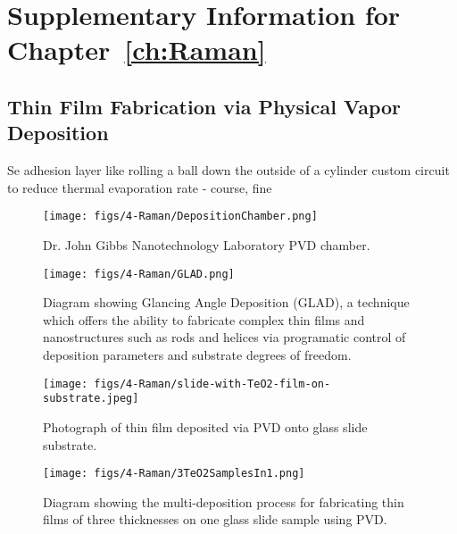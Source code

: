 \chapter{Supplementary Information for Chapter~\ref{ch:Raman}}
\label{appendix: Raman}
\acresetall

\section{Thin Film Fabrication via Physical Vapor Deposition}
\label{Raman:Appendix:sec:ThinFilmFabricationViaPVD}

Se adhesion layer
like rolling a ball down the outside of a cylinder
custom circuit to reduce thermal evaporation rate - course, fine

\begin{figure}[t]
  \centering
  \texttt{[image: figs/4-Raman/DepositionChamber.png]}
  \caption{Dr. John Gibbs Nanotechnology Laboratory \ac{PVD} chamber.}
  \label{fig:Raman:DepositionChamber}
\end{figure}

\begin{figure}[t]
  \centering
  \texttt{[image: figs/4-Raman/GLAD.png]}
  \caption{Diagram showing Glancing Angle Deposition (\acs{GLAD}), a technique which offers the ability to fabricate complex thin films and nanostructures such as rods and helices via programatic control of deposition parameters and substrate degrees of freedom.}
  \label{fig:Raman:GLAD}
\end{figure}

\begin{figure}[t]
  \centering
  \texttt{[image: figs/4-Raman/slide-with-TeO2-film-on-substrate.jpeg]}
  \caption{Photograph of  thin film deposited via \ac{PVD} onto glass slide substrate.}%
  \label{fig:Raman:TeO2onSubstrate}
\end{figure}

\begin{figure}[t]
  \centering
  \texttt{[image: figs/4-Raman/3TeO2SamplesIn1.png]}
  \caption{Diagram showing the multi-deposition process for fabricating  thin films of three thicknesses on one glass slide sample using \ac{PVD}.}
  \label{fig:Raman:3in1}
\end{figure}

